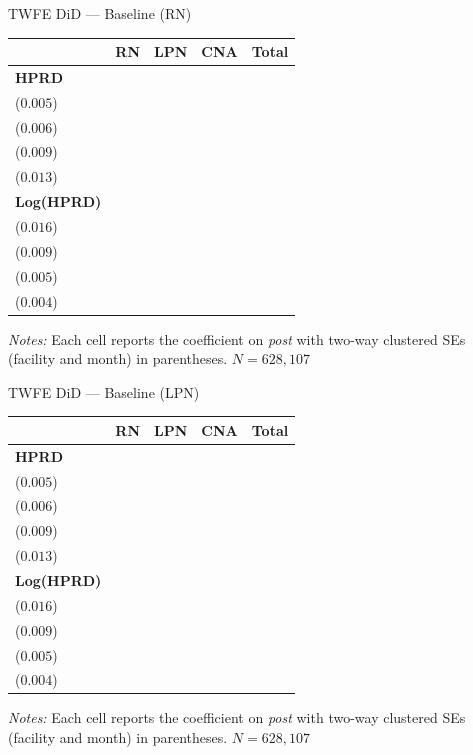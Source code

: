 \documentclass{beamer}
\newcommand{\hlest}[3]{%
  {\setlength{\fboxsep}{1.2pt}\colorbox{yellow}{\est{#1}{#2}{#3}}}%
}
\newcommand{\sym}[1]{\rlap{$^{#1}$}}
\newcommand{\est}[3]{\makecell[c]{#1\sym{#3}\\ \footnotesize(#2)}}
\begin{document}
\begin{frame}{TWFE DiD --- Baseline (RN)}
\small
\centering
\renewcommand{\arraystretch}{1.15}
\setlength{\tabcolsep}{8pt}

\begin{threeparttable}
\begin{tabular}{@{} l cccc @{}}
\toprule
 & \textbf{RN} & \textbf{LPN} & \textbf{CNA} & \textbf{Total} \\
\midrule
\textbf{HPRD} &
\hlest{$-0.032$}{$0.005$}{***} &
\est{$\phantom{-}0.000$}{$0.006$}{} &
\est{$-0.054$}{$0.009$}{***} &
\est{$-0.086$}{$0.013$}{***} \\
\textbf{Log(HPRD)} &
\hlest{$-0.092$}{$0.016$}{***} &
\est{$\phantom{-}0.003$}{$0.009$}{} &
\est{$-0.028$}{$0.005$}{***} &
\est{$-0.026$}{$0.004$}{***} \\
\bottomrule
\end{tabular}

\begin{tablenotes}[flushleft]
\footnotesize
\item \textit{Notes:} Each cell reports the coefficient on \textit{post} with two-way clustered SEs (facility and month) in parentheses. $N=628{,}107$
\end{tablenotes}
\end{threeparttable}
\end{frame}

\begin{frame}{TWFE DiD --- Baseline (LPN)}
\small
\centering
\renewcommand{\arraystretch}{1.15}
\setlength{\tabcolsep}{8pt}

\begin{threeparttable}
\begin{tabular}{@{} l cccc @{}}
\toprule
 & \textbf{RN} & \textbf{LPN} & \textbf{CNA} & \textbf{Total} \\
\midrule
\textbf{HPRD} &
\est{$-0.032$}{$0.005$}{***} &
\hlest{$\phantom{-}0.000$}{$0.006$}{} &
\est{$-0.054$}{$0.009$}{***} &
\est{$-0.086$}{$0.013$}{***} \\
\textbf{Log(HPRD)} &
\est{$-0.092$}{$0.016$}{***} &
\hlest{$\phantom{-}0.003$}{$0.009$}{} &
\est{$-0.028$}{$0.005$}{***} &
\est{$-0.026$}{$0.004$}{***} \\
\bottomrule
\end{tabular}

\begin{tablenotes}[flushleft]
\footnotesize
\item \textit{Notes:} Each cell reports the coefficient on \textit{post} with two-way clustered SEs (facility and month) in parentheses. $N=628{,}107$
\end{tablenotes}
\end{threeparttable}
\end{frame}
\end{document}
